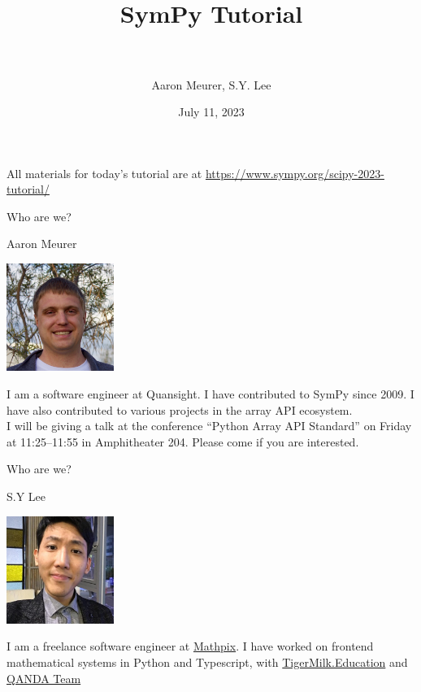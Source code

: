 \documentclass[xcolor=svgnames]{beamer}
\title[SymPy\hspace{4em}\insertframenumber/
\inserttotalframenumber]{~\\ SymPy Tutorial \\~}
\author[A. Meurer, S.Y. Lee]
{Aaron Meurer, S.Y. Lee}
\institute{\pgfuseimage{mylogo}}
\date{July 11, 2023}
\begin{document}
\begin{frame}
  \maketitle
\begin{center}
\normalsize All materials for today's tutorial are at \url{https://www.sympy.org/scipy-2023-tutorial/}
\end{center}
\end{frame}

\begin{frame}{Who are we?}
  \begin{block}{Aaron Meurer}
    \begin{center}
      \includegraphics[height=3.5cm]{aaron.png}
    \end{center}
    I am a software engineer at Quansight. I have contributed to SymPy since
    2009. I have also contributed to various projects in the array API
    ecosystem.
    \\
    I will be giving a talk at the conference ``Python Array API Standard'' on
    Friday at 11:25–11:55 in Amphitheater 204. Please come if you are
    interested.
  \end{block}
\end{frame}

\begin{frame}{Who are we?}
  \begin{block}{S.Y Lee}
    \begin{center}
      \includegraphics[height=3.5cm]{sylee.jpeg}
    \end{center}
    I am a freelance software engineer at \href{https://mathpix.com/}{Mathpix}.
    I have worked on frontend mathematical systems in Python and Typescript,
    with \href{https://www.tigermilk.education/}{TigerMilk.Education} and \href{https://mathpresso.com/}{QANDA Team}
  \end{block}
\end{frame}
\end{document}
